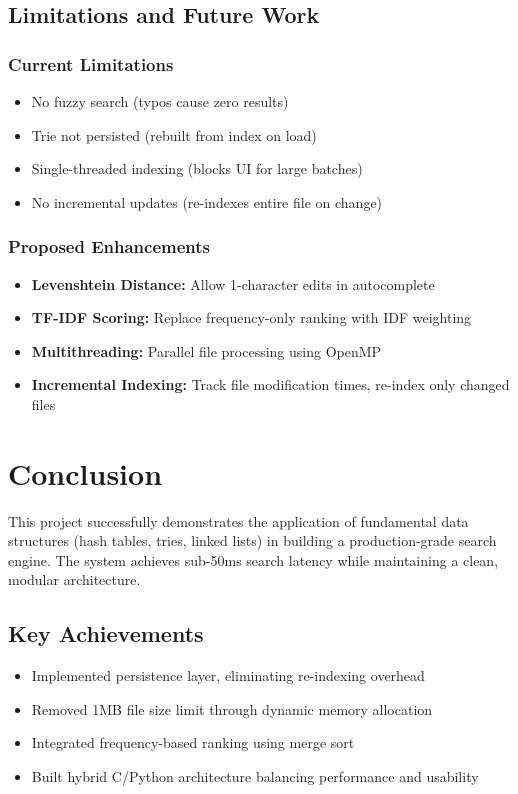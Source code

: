 \documentclass[12pt,a4paper]{article}
\begin{document}
\subsection{Limitations and Future Work}

\subsubsection{Current Limitations}
\begin{itemize}
    \item No fuzzy search (typos cause zero results)
    \item Trie not persisted (rebuilt from index on load)
    \item Single-threaded indexing (blocks UI for large batches)
    \item No incremental updates (re-indexes entire file on change)
\end{itemize}

\subsubsection{Proposed Enhancements}
\begin{itemize}
    \item \textbf{Levenshtein Distance:} Allow 1-character edits in autocomplete
    \item \textbf{TF-IDF Scoring:} Replace frequency-only ranking with IDF weighting
    \item \textbf{Multithreading:} Parallel file processing using OpenMP
    \item \textbf{Incremental Indexing:} Track file modification times, re-index only changed files
\end{itemize}

\newpage
\section{Conclusion}

This project successfully demonstrates the application of fundamental data structures (hash tables, tries, linked lists) in building a production-grade search engine. The system achieves sub-50ms search latency while maintaining a clean, modular architecture.

\subsection{Key Achievements}
\begin{itemize}
    \item Implemented persistence layer, eliminating re-indexing overhead
    \item Removed 1MB file size limit through dynamic memory allocation
    \item Integrated frequency-based ranking using merge sort
    \item Built hybrid C/Python architecture balancing performance and usability
\end{itemize}
\end{document}
